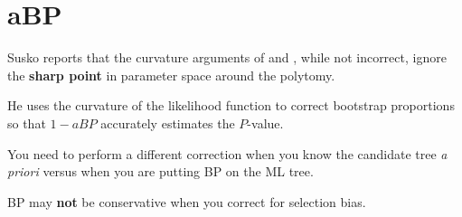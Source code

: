 \documentclass[landscape]{foils}
\begin{document}
\myNewSlide
\section*{\cite{Susko2010} aBP}
Susko reports that the curvature arguments of \citet{EfronHH1996} and \citet{Shimodaira2002}, while not incorrect, ignore the {\bf sharp point} in parameter space around the polytomy.

He uses the curvature of the likelihood function to correct bootstrap proportions so that $1-aBP$ accurately estimates the $P$-value.

You need to perform a different correction when you know the candidate tree {\em a priori} versus when you are putting BP on the ML tree.

BP may {\bf not} be conservative when you correct for selection bias.
\end{document}
